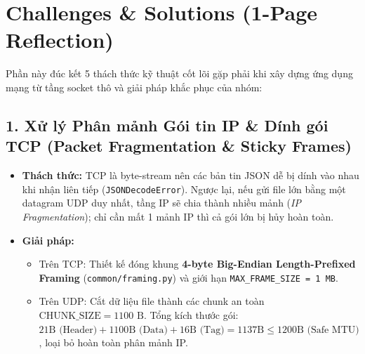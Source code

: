 \section{Challenges \& Solutions (1-Page Reflection)}

Phần này đúc kết 5 thách thức kỹ thuật cốt lõi gặp phải khi xây dựng ứng dụng mạng từ tầng socket thô và giải pháp khắc phục của nhóm:

\subsection{1. Xử lý Phân mảnh Gói tin IP \& Dính gói TCP (Packet Fragmentation \& Sticky Frames)}
\begin{itemize}
    \item \textbf{Thách thức:} TCP là byte-stream nên các bản tin JSON dễ bị dính vào nhau khi nhận liên tiếp (\texttt{JSONDecodeError}). Ngược lại, nếu gửi file lớn bằng một datagram UDP duy nhất, tầng IP sẽ chia thành nhiều mảnh (\textit{IP Fragmentation}); chỉ cần mất 1 mảnh IP thì cả gói lớn bị hủy hoàn toàn.
    \item \textbf{Giải pháp:} 
    \begin{itemize}
        \item Trên TCP: Thiết kế đóng khung \textbf{4-byte Big-Endian Length-Prefixed Framing} (\texttt{common/framing.py}) và giới hạn \texttt{MAX\_FRAME\_SIZE = 1 MB}.
        \item Trên UDP: Cắt dữ liệu file thành các chunk an toàn $\text{CHUNK\_SIZE} = 1100\text{ B}$. Tổng kích thước gói: $21\text{B (Header)} + 1100\text{B (Data)} + 16\text{B (Tag)} = 1137\text{B} \le 1200\text{B (Safe MTU)}$, loại bỏ hoàn toàn phân mảnh IP.
    \end{itemize}
\end{itemize}

